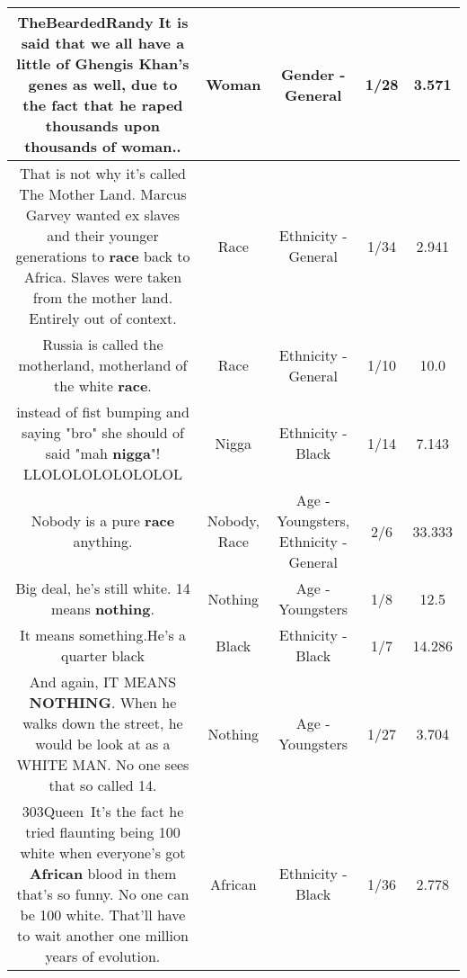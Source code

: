 \documentclass[11pt]{article}
\newlength\mylength
\begin{document}
\begin{center}
\begin{longtable}{|C{.65\mylength}|C{.30\mylength}|C{.12\mylength}|C{.12\mylength}|C{.12\mylength}|}
  \small TheBeardedRandy It is said that we all have a little of Ghengis Khan's​ genes as well, due to the fact that he raped thousands upon thousands of \textbf{woman}..\normalsize   & Woman & Gender - General & 1/28 & 3.571 \\  \hline
  \small That is not why it's called The Mother Land. Marcus Garvey wanted ex slaves and their younger generations to \textbf{race} back to Africa. Slaves were taken from the mother land. Entirely out of context.\normalsize   & Race & Ethnicity - General & 1/34 & 2.941 \\  \hline
  \small Russia is called the motherland, motherland of the white \textbf{race}.\normalsize   & Race & Ethnicity - General & 1/10 & 10.0 \\  \hline
  \small instead of fist bumping and saying "bro" she should of said "mah \textbf{nigga}"! LLOLOLOLOLOLOLOL\normalsize   & Nigga & Ethnicity - Black & 1/14 & 7.143 \\  \hline
  \small Nobody is a pure \textbf{race} anything.\normalsize   & Nobody, Race & Age - Youngsters, Ethnicity - General & 2/6 & 33.333 \\  \hline
  \small Big deal, he's still white. 14 means \textbf{nothing}.\normalsize   & Nothing & Age - Youngsters & 1/8 & 12.5 \\  \hline
  \small It means something.He's a quarter black\normalsize   & Black & Ethnicity - Black & 1/7 & 14.286 \\  \hline
  \small And again, IT MEANS \textbf{NOTHING}. When he walks down the street, he would be look at as a WHITE MAN. No one sees that so called 14.\normalsize   & Nothing & Age - Youngsters & 1/27 & 3.704 \\  \hline
  \small \@303Queen It's the fact he tried flaunting being 100 white when everyone's got \textbf{African} blood in them that's so funny. No one can be 100 white. That'll have to wait another one million years of evolution.\normalsize   & African & Ethnicity - Black & 1/36 & 2.778 \\  \hline

\end{longtable}
\end{center}
\end{document}
